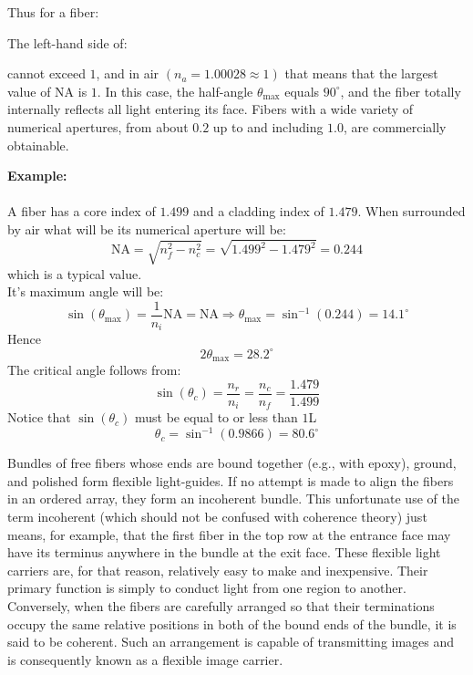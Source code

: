 	Thus for a fiber:
	
	The left-hand side of:
	
	cannot exceed $1$, and in air $\left(n_{a}=1.00028 \approx 1\right)$ that means that the largest value of $\mathrm{NA}$ is $1$. In this case, the half-angle $\theta_{\max }$ equals $90^{\circ}$, and the fiber totally internally reflects all light entering its face. Fibers with a wide variety of numerical apertures, from about $0.2$ up to and including $1.0$, are commercially obtainable.
	
	\begin{tcolorbox}[colframe=black,colback=white,sharp corners]
	\textbf{{\Large {}}Example:}\\\\
	A fiber has a core index of $1.499$ and a cladding index of $1.479$. When surrounded by air what will be its numerical aperture will be:
	$$
	\mathrm{NA}=\sqrt{n_{f}^{2}-n_{c}^{2}} =\sqrt{1.499^{2}-1.479^{2}}=0.244
	$$
	which is a typical value.\\
	
	It's maximum angle will be:
	$$
	\sin (\theta_{\max })=\dfrac{1}{n_{i}} \mathrm{NA}=\mathrm{NA} \Rightarrow \theta_{\max }=\sin ^{-1}(0.244)=14.1^{\circ}
	$$
	Hence
	$$
	2 \theta_{\max }=28.2^{\circ}
	$$
	The critical angle follows from:
	$$
	\sin(\theta_{c})=\dfrac{n_{r}}{n_{i}}=\frac{n_{c}}{n_{f}}=\frac{1.479}{1.499}
	$$
	Notice that $\sin(\theta_{c})$ must be equal to or less than $1$L
	$$
	\theta_{c}=\sin ^{-1} (0.9866)=80.6^{\circ}
	$$
	\end{tcolorbox}
	Bundles of free fibers whose ends are bound together (e.g., with epoxy), ground, and polished form flexible light-guides. If no attempt is made to align the fibers in an ordered array, they form an incoherent bundle. This unfortunate use of the term incoherent (which should not be confused with coherence theory) just means, for example, that the first fiber in the top row at the entrance face may have its terminus anywhere in the bundle at the exit face. These flexible light carriers are, for that reason, relatively easy to make and inexpensive. Their primary function is simply to conduct light from one region to another. Conversely, when the fibers are carefully arranged so that their terminations occupy the same relative positions in both of the bound ends of the bundle, it is said to be coherent. Such an arrangement is capable of transmitting images and is consequently known as a flexible image carrier.

